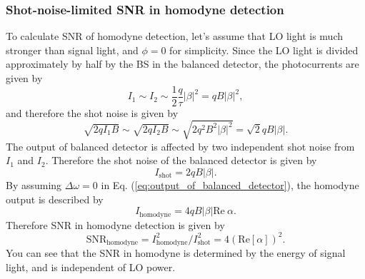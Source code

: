 \subsubsection{Shot-noise-limited SNR in homodyne detection}

To calculate SNR of homodyne detection, let's assume that LO light is much stronger than signal light, and $\phi = 0$ for simplicity. Since the LO light is divided approximately by half by the BS in the balanced detector, the photocurrents are given by
\begin{equation}
  I_1 \sim I_2 \sim \frac 1 2 \frac q {\tau} |\beta|^2 = qB|\beta|^2,
\end{equation}
and therefore the shot noise is given by
\begin{equation}
  \sqrt{2qI_1B} \sim \sqrt{2qI_2B} \sim \sqrt{2q^2B^2|\beta|^2} =\sqrt 2 qB|\beta|.
\end{equation}
The output of balanced detector is affected by two independent shot noise from $I_1$ and $I_2$. Therefore the shot noise of the balanced detector is given by
\begin{equation}
  I_\mathrm{shot} = 2qB|\beta|.
  \label{eq:shot_noise_of_balanced_detector}
\end{equation}
By assuming $\Delta \omega = 0$ in Eq. (\ref{eq:output_of_balanced_detector}), the homodyne output is described by
\begin{equation}
  I_\mathrm{homodyne} = 4qB|\beta|\mathrm{Re} \ \alpha.
\end{equation}
Therefore SNR in homodyne detection is given by
\begin{equation}
  \mathrm{SNR_{homodyne}} = I_\mathrm{homodyne}^2/I_\mathrm{shot}^2 = 4(\mathrm{Re}[\alpha])^2.
  \label{eq:SNR_homodyne}
\end{equation}
You can see that the SNR in homodyne is determined by the energy of signal light, and is independent of LO power.

